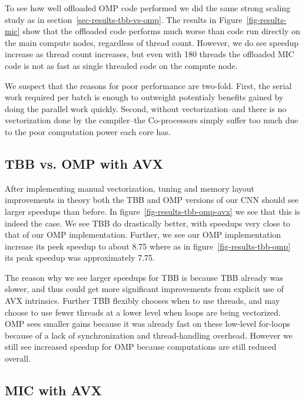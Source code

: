 
% 

To see how well offloaded OMP code performed we did the same strong scaling study as in section~\ref{sec-results-tbb-vs-omp}. The results in Figure~\ref{fig-results-mic} show that the offloaded code performs much worse than code run directly on the main compute nodes, regardless of thread count. However, we do see speedup increase as thread count increases, but even with 180 threads the offloaded MIC code is not as fast as single threaded code on the compute node.

We suspect that the reasons for poor performance are two-fold. First, the serial work required per batch is enough to outweight potentialy benefits gained by doing the parallel work quickly. Second, without vectorization--and there is no vectorization done by the compiler--the Co-processors simply suffer too much due to the poor computation power each core has.

\subsection{TBB vs. OMP with AVX}
\label{sec-results-tbb-omp-avx}

After implementing manual vectorization, tuning and memory layout improvements in theory both the TBB and OMP versions of our CNN should see larger speedups than before. In figure~\ref{fig-results-tbb-omp-avx} we see that this is indeed the case. We see TBB do drastically better, with speedups very close to that of our OMP implementation. Further, we see our OMP implementation increase its peek speedup to about 8.75 where as in figure~\ref{fig-results-tbb-omp} its peak speedup was approximately 7.75.

The reason why we see larger speedups for TBB is because TBB already was slower, and thus could get more significant improvements from explicit use of AVX intrinsics. Further TBB flexibly chooses when to use threads, and may choose to use fewer threads at a lower level when loops are being vectorized. OMP sees smaller gains because it was already fast on these low-level for-loops because of a lack of synchronization and thread-handling overhead. However we still see increased speedup for OMP because computations are still reduced overall.

\subsection{MIC with AVX}
\label{sec-results-mic-avx}

